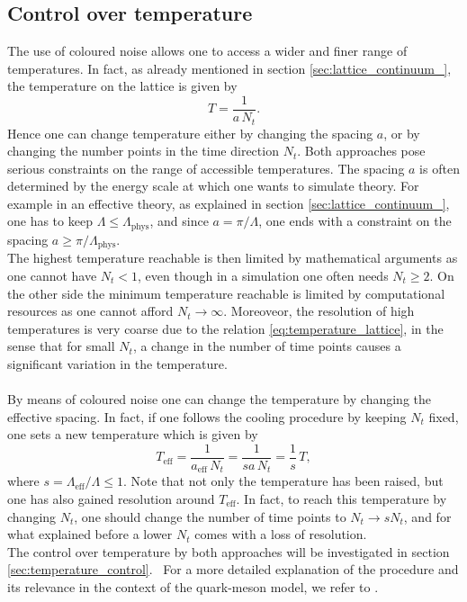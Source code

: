 \subsection{Control over temperature}
The use of coloured noise allows one to access a wider and finer range of temperatures. In fact, as already mentioned in section \ref{sec:lattice_continuum_}, the temperature on the lattice is given by 
\begin{equation}
    T = \frac{1}{a \, N_t}.
    \label{eq:temperature_lattice}
\end{equation}
Hence one can change temperature either by changing the spacing $a$, or by changing the number points in the time direction $N_t$. 
Both approaches pose serious constraints on the range of accessible temperatures. The spacing $a$ is often determined by the energy scale at which one wants to simulate theory. 
For example in an effective theory, as explained in section \ref{sec:lattice_continuum_}, one has to keep $\Lambda \leq \Lambda_\text{phys}$, and since $a = \pi/\Lambda$, one ends with a constraint on the spacing $a \geq \pi/\Lambda_\text{phys}$. \\
The highest temperature reachable is then limited by mathematical arguments as one cannot have $N_t < 1$, even though in a simulation one often needs $N_t \geq 2$. On the other side the minimum temperature reachable is limited by computational resources as one cannot afford $N_t \to \infty$.
Moreoveor, the resolution of high temperatures is very coarse due to the relation \eqref{eq:temperature_lattice}, in the sense that for small $N_t$, a change in the number of time points causes a significant variation in the temperature. \\~\\
By means of coloured noise one can change the temperature by changing the effective spacing. In fact, if one follows the cooling procedure by keeping $N_t$ fixed, one sets a new temperature which is given by 
\begin{equation*}
    T_\text{eff} = \frac{1}{a_\text{eff} \, N_t} = \frac{1}{sa \, N_t} = \frac{1}{s} \, T,
\end{equation*}
where $s = \Lambda_\text{eff} / \Lambda \leq 1$. Note that not only the temperature has been raised, but one has also gained resolution around $T_\text{eff}$. In fact, to reach this temperature by changing $N_t$, one should change the number of time points to $N_t \to s N_t$, and for what explained before a lower $N_t$ comes with a loss of resolution. \\
The control over temperature by both approaches will be investigated in section \ref{sec:temperature_control}. \
For a more detailed explanation of the procedure and its relevance in the context of the quark-meson model, we refer to \cite{attanasio2022low}.
\newpage
